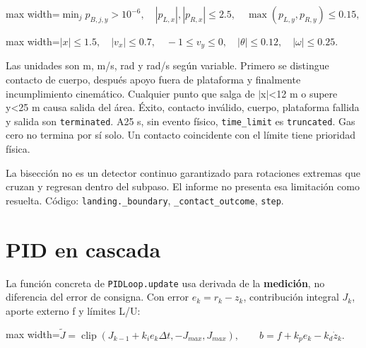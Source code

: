 \documentclass[12pt,a4paper]{article}
\begin{document}
\begin{center}\begin{adjustbox}{max width=\linewidth}$\displaystyle \min_j p_{B,j,y}>10^{-6},\quad |p_{L,x}|,|p_{R,x}|\le2.5,
\quad \max(p_{L,y},p_{R,y})\le0.15,$\end{adjustbox}\end{center}


\begin{center}\begin{adjustbox}{max width=\linewidth}$\displaystyle |x|\le1.5,\quad |v_x|\le0.7,\quad -1\le v_y\le0,
\quad |\theta|\le0.12,\quad |\omega|\le0.25.$\end{adjustbox}\end{center}



Las unidades son m,\allowbreak{} m/\allowbreak{}s,\allowbreak{} rad y rad/\allowbreak{}s según variable. Primero se distingue contacto de cuerpo,\allowbreak{} después apoyo fuera de plataforma y finalmente incumplimiento cinemático. Cualquier punto que salga de \ensuremath{\vert}x\ensuremath{\vert}<12 m o supere y<25 m causa salida del área. Éxito,\allowbreak{} contacto inválido,\allowbreak{} cuerpo,\allowbreak{} plataforma fallida y salida son \nolinkurl{terminated}. A25 s,\allowbreak{} sin evento físico,\allowbreak{} \nolinkurl{time_limit} es \nolinkurl{truncated}. Gas cero no termina por sí solo. Un contacto coincidente con el límite tiene prioridad física.


La bisección no es un detector continuo garantizado para rotaciones extremas que cruzan y regresan dentro del subpaso. El informe no presenta esa limitación como resuelta. Código: \nolinkurl{landing._boundary},\allowbreak{} \nolinkurl{_contact_outcome},\allowbreak{} \nolinkurl{step}.



\section{PID en cascada}
La función concreta de \textcolor{Accent}{\nolinkurl{PIDLoop.update}} usa derivada de la \textbf{medición},\allowbreak{} no diferencia del error de consigna. Con error $e_k=r_k-z_k$,\allowbreak{} contribución integral $J_k$,\allowbreak{} aporte externo f y límites L/\allowbreak{}U:



\begin{center}\begin{adjustbox}{max width=\linewidth}$\displaystyle \widetilde J=\operatorname{clip}(J_{k-1}+k_i e_k\Delta t,-J_{max},J_{max}),
\qquad b=f+k_p e_k-k_d\dot z_k.$\end{adjustbox}\end{center}
\end{document}
